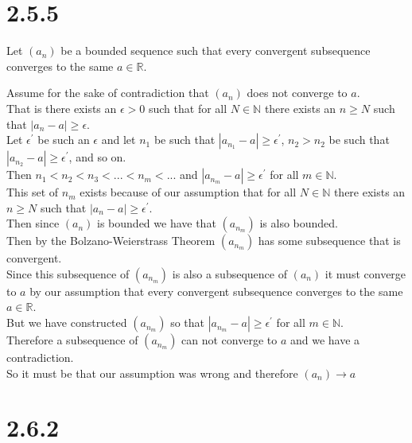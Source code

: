 \documentclass{article}
\begin{document}
\section*{2.5.5} Let $(a_n)$ be a bounded sequence such that every convergent subsequence converges to the same $a\in\mathbb{R}$.
\begin{center}
    \doublespacing
    Assume for the sake of contradiction that $(a_n)$ does not converge to $a$.
    \\That is there exists an $\epsilon > 0$ such that for all $N\in\mathbb{N}$ there exists an $n\geq N$ such that $|a_n - a|\geq\epsilon$.
    \\Let $\epsilon ^{'}$ be such an $\epsilon$ and let $n_1$ be such that $|a_{n_1} - a|\geq\epsilon ^{'}$, $n_2 > n_2$ be such that $|a_{n_2} - a|\geq\epsilon ^{'}$, and so on.
    \\Then $n_1 < n_2 < n_3 < ... < n_m < ...$ and $|a_{n_m} - a|\geq\epsilon ^{'}$ for all $m\in\mathbb{N}$.
    \\This set of $n_m$ exists because of our assumption that for all $N\in\mathbb{N}$ there exists an $n\geq N$ such that $|a_n - a|\geq\epsilon ^{'}$.
    \\Then since $(a_n)$ is bounded we have that $(a_{n_m})$ is also bounded.
    \\Then by the Bolzano-Weierstrass Theorem $(a_{n_m})$ has some subsequence that is convergent.
    \\Since this subsequence of $(a_{n_m})$ is also a subsequence of $(a_n)$ it must converge to $a$ by our assumption that every convergent subsequence converges to the same $a\in\mathbb{R}$.
    \\But we have constructed $(a_{n_m})$ so that $|a_{n_m} - a|\geq\epsilon ^{'}$ for all $m\in\mathbb{N}$.
    \\Therefore a subsequence of $(a_{n_m})$ can not converge to $a$ and we have a contradiction.
    \\So it must be that our assumption was wrong and therefore $(a_n)\rightarrow a$ \qedsymbol
\end{center}


\newpage
\section*{2.6.2}
\end{document}
